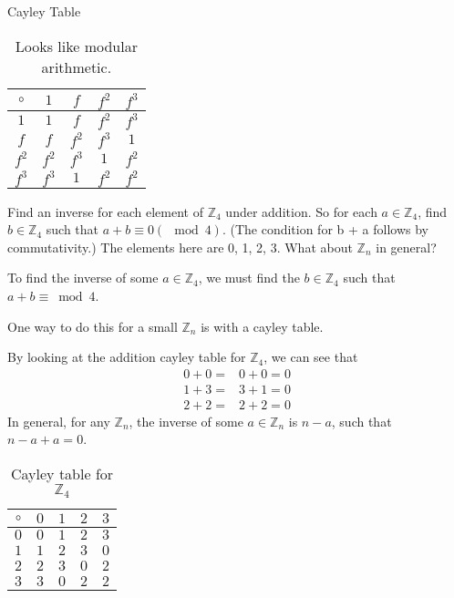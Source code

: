 \begin{table}
\centering
\caption{Cayley Table}
\begin{tabular}{c|cccc}
 $\circ$ & $1$ & $f$ & $f^2$ & $f^3$ \\
 \hline
 $1$ & $1$ & $f$ & $f^2$ & $f^3$ \\
 $f$ & $f$ & $f^2$ & $f^3$ & $1$ \\
 $f^2$ & $f^2$ & $f^3$ & $1$ & $f^2$ \\
 $f^3$ & $f^3$ & $1$ & $f^2$ & $f^2$ \\
\end{tabular}
\caption{Looks like modular arithmetic.}
\end{table}
\begin{ttta}
Find an inverse for each element of $\mathbb{Z}_4$ under addition. So for each $a \in
\mathbb{Z}_4$, find $b \in \mathbb{Z}_4$ such that $a + b \equiv 0 (\mod 4)$.
(The condition for b + a follows by commutativity.) The elements here are 0, 1,
2, 3. What about $\mathbb{Z}_n$ in general?
\end{ttta}
\begin{proofitem}
\item To find the inverse of some $a\in\mathbb{Z}_4$, we must find the
    $b\in\mathbb{Z}_4$ such that $a+b\equiv\bmod 4$.
\item One way to do this for a small $\mathbb{Z}_n$ is with a cayley table.
\item By looking at the addition cayley table for $\mathbb{Z}_4$, we can see that
    \begin{align}
        0+0=&0+0=0\\
        1+3=&3+1=0\\
        2+2=&2+2=0
    \end{align}
    In general, for any $\mathbb{Z}_n$, the inverse of some $a\in\mathbb{Z}_n$
    is $n-a$, such that $n-a+a=0$.
\begin{table}
\centering
\begin{tabular}{c|cccc}
 $\circ$ & $0$ & $1$ & $2$ & $3$ \\
 \hline
 $0$ & $0$ & $1$ & $2$ & $3$ \\
 $1$ & $1$ & $2$ & $3$ & $0$ \\
 $2$ & $2$ & $3$ & $0$ & $2$ \\
 $3$ & $3$ & $0$ & $2$ & $2$ \\
\end{tabular}
\caption{Cayley table for $\mathbb{Z}_4$}
\end{table}
\end{proofitem}


